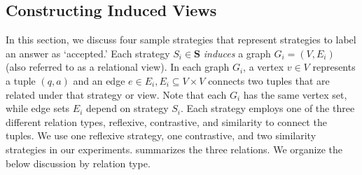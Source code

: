 


%

\subsection{Constructing Induced Views}
\label{sub:Induced Views}


In this section, we discuss four sample strategies that represent strategies to label an answer as `accepted.' Each strategy $S_i \in \mathbf{S}$ \textit{induces} a graph $G_i = (V, E_i)$ (also referred to as a relational view). In each graph $G_i$, a vertex $v \in V$ represents a tuple $(q,a)$ and an edge $e \in E_i, E_i \subseteq V \times V$ connects two tuples that are related under that strategy or view. Note that each $G_i$ has the same vertex set, while edge sets $E_i$ depend on strategy $S_i$. Each strategy employs one of the three different relation types, reflexive, contrastive, and similarity to connect the tuples. We use one reflexive strategy, one contrastive, and two similarity strategies in our experiments.  summarizes the three relations. We organize the below discussion by relation type.

